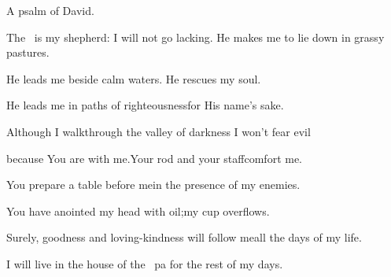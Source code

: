 
\begin{inparaenum}
  \noindent{} A psalm of David.\smallskip%
  
  \pc The \lord\ is my shepherd: I will not go lacking.\pa {} He makes me to lie down in grassy pastures.%
  
  \pc He leads me beside calm waters.\pa {} He rescues my soul.%
  
  \pc He leads me in paths of righteousness\pa for His name's sake.%
  
  \pb {} Although I walk\pa through the valley of darkness%
  \pa I won't fear evil%
  
  \pc because You are with me.\pa Your rod and your staff\pa comfort me.%
  
  \pb {} You prepare a table before me\pa in the presence of my enemies.%
  
  \pc You have anointed my head with oil;\pa my cup overflows.%
  
  \pb {} Surely, goodness and loving-kindness%
  will follow me\pa all the days of my life.%
  
  \pc I will live in the house of the \lord\ pa for the rest of my days.%
\end{inparaenum}
